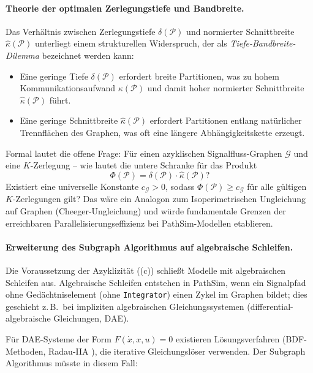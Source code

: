 ﻿\documentclass[12pt,a4paper]{article}
\theoremstyle{definition}
\begin{document}
\paragraph{Theorie der optimalen Zerlegungstiefe und Bandbreite.}
Das Verhältnis zwischen Zerlegungstiefe $\delta(\mathcal{P})$ und
normierter Schnittbreite $\hat{\kappa}(\mathcal{P})$ unterliegt einem
strukturellen Widerspruch, der als \emph{Tiefe-Bandbreite-Dilemma}
bezeichnet werden kann:

\begin{itemize}[nosep]
  \item Eine geringe Tiefe $\delta(\mathcal{P})$ erfordert breite Partitionen,
        was zu hohem Kommunikationsaufwand $\kappa(\mathcal{P})$
        und damit hoher normierter Schnittbreite $\hat{\kappa}(\mathcal{P})$ führt.
  \item Eine geringe Schnittbreite $\hat{\kappa}(\mathcal{P})$ erfordert
        Partitionen entlang natürlicher Trennflächen des Graphen,
        was oft eine längere Abhängigkeitskette erzeugt.
\end{itemize}

Formal lautet die offene Frage: Für einen azyklischen Signalfluss-Graphen
$\mathcal{G}$ und eine $K$-Zerlegung -- wie lautet die untere Schranke
für das Produkt
\[
  \Phi(\mathcal{P}) = \delta(\mathcal{P}) \cdot \hat{\kappa}(\mathcal{P})?
\]
Existiert eine universelle Konstante $c_{\mathcal{G}} > 0$, sodass
$\Phi(\mathcal{P}) \geq c_{\mathcal{G}}$ für alle gültigen $K$-Zerlegungen
gilt? Das wäre ein Analogon zum Isoperimetrischen Ungleichung auf
Graphen (Cheeger-Ungleichung) und würde fundamentale Grenzen der
erreichbaren Parallelisierungseffizienz bei PathSim-Modellen etablieren.

\paragraph{Erweiterung des Subgraph Algorithmus auf algebraische Schleifen.}
Die Voraussetzung der Azyklizität ((c)) schließt
Modelle mit algebraischen Schleifen aus. Algebraische Schleifen
entstehen in PathSim, wenn ein Signalpfad ohne Gedächtniselement
(ohne \texttt{Integrator}) einen Zykel im Graphen bildet; dies
geschieht z.\,B.\ bei impliziten algebraischen Gleichungssystemen
(differential-algebraische Gleichungen, DAE).

Für DAE-Systeme der Form $F(\dot{x}, x, u) = 0$ existieren
Lösungsverfahren (BDF-Methoden, Radau-IIA \cite{gear1971}), die
iterative Gleichungslöser verwenden. Der Subgraph Algorithmus
müsste in diesem Fall:
\end{document}
